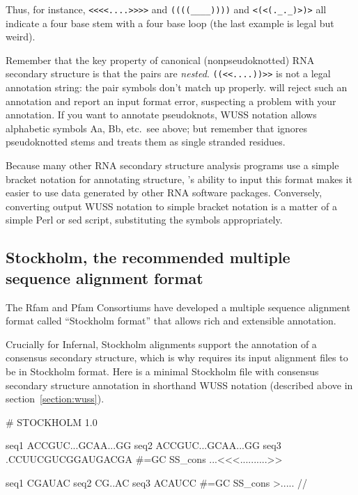 Thus, for instance, \verb+<<<<....>>>>+ and \verb+((((____))))+ and
\verb+<(<(._._)>)>+ all indicate a four base stem with a four base
loop (the last example is legal but weird). 

Remember that the key property of canonical (nonpseudoknotted) RNA
secondary structure is that the pairs are \emph{nested}.
\verb+((<<....))>>+ is not a legal annotation string: the pair symbols
don't match up properly.  will reject such an
annotation and report an input format error, suspecting a problem with
your annotation.  If you want to annotate pseudoknots, WUSS notation
allows alphabetic symbols Aa, Bb, etc.\, see above; but remember that
 ignores pseudoknotted stems and treats them as
single stranded residues.

Because many other RNA secondary structure analysis programs use a
simple bracket notation for annotating structure,
's ability to input this format makes it easier to
use data generated by other RNA software packages. Conversely,
converting  output WUSS notation to simple bracket
notation is a matter of a simple Perl or sed script, substituting the
symbols appropriately.

\subsection{Stockholm, the recommended multiple sequence alignment format}
\label{section:stockholm}

The Rfam and Pfam Consortiums have developed a multiple sequence
alignment format called ``Stockholm format'' that allows rich and
extensible annotation. 

Crucially for Infernal, Stockholm alignments support the annotation of 
a consensus secondary structure, which is why  requires
its input alignment files to be in Stockholm format. Here is a minimal
Stockholm file with consensus secondary structure annotation in
shorthand WUSS notation (described above in
section~\ref{section:wuss}).

\begin{sreoutput}
# STOCKHOLM 1.0

seq1           ACCGUC...GCAA...GG
seq2           ACCGUC...GCAA...GG
seq3           .CCUUCGUCGGAUGACGA
#=GC SS_cons   ...<<<..........>>

seq1           CGAUAC
seq2           CG..AC
seq3           ACAUCC
#=GC SS_cons   >.....
//
\end{sreoutput}


